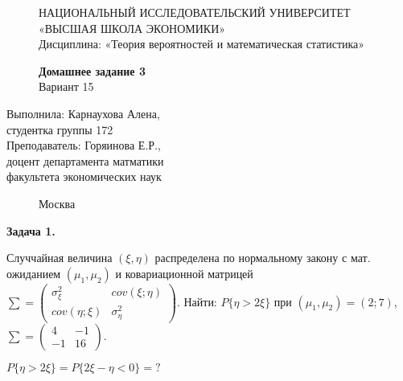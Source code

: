 \documentclass[]{article}
\begin{document}
	\begin{figure}[t]
		\centering
		\large
		НАЦИОНАЛЬНЫЙ ИССЛЕДОВАТЕЛЬСКИЙ УНИВЕРСИТЕТ\\
		«ВЫСШАЯ ШКОЛА ЭКОНОМИКИ»\\
		Дисциплина: «Теория вероятностей и математическая статистика»
	\end{figure}
	
	\begin{figure}[h]
	\vspace{3in}
	\centering
	\Huge
	\textbf{Домашнее задание 3}\\
	Вариант 15 
	\end{figure}
	
	\vspace{2in}
	\Large
	\raggedleft
	Выполнила: Карнаухова Алена,\\
	студентка группы 172\\
	\vspace{12pt}
	Преподаватель: Горяинова Е.Р.,\\
	доцент департамента матматики\\
	факультета экономических наук
	
	\begin{figure}[b]
		\centering
		Москва \the\year
	\end{figure}
	
	\thispagestyle{empty}
	
	\newpage
	
	\centering
	\large
	\textbf{Задача 1.}
	
	\vspace{10pt}
	
	\raggedright

	Случчайная величина $(\xi, \eta)$ распределена по нормальному закону с мат. ожиданием $(\mu_1, \mu_2)$ и ковариационной матрицей 
	$\sum = 
 \begin{pmatrix}
  \sigma_{\xi}^2 & cov(\xi; \eta) \\
  cov(\eta; \xi) & \sigma_{\eta}^2 
 \end{pmatrix}$. Найти: $P\{ \eta > 2\xi\}$ при $(\mu_1, \mu_2) = (2;7)$, $\sum = 
 \begin{pmatrix}
  4 & -1 \\
  -1 & 16 
 \end{pmatrix}$.
 
 \vspace{20pt}
 
 $P\{\eta > 2 \xi\} = P\{2 \xi - \eta < 0\} = ?$
 
\end{document}
